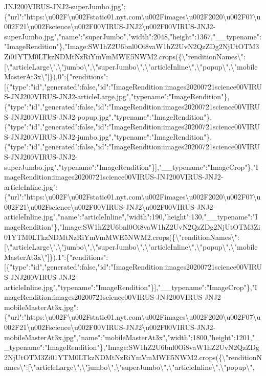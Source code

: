 JNJ200VIRUS-JNJ2-superJumbo.jpg":\{"url":"https:\textbackslash{}u002F\textbackslash{}u002Fstatic01.nyt.com\textbackslash{}u002Fimages\textbackslash{}u002F2020\textbackslash{}u002F07\textbackslash{}u002F21\textbackslash{}u002Fscience\textbackslash{}u002F00VIRUS-JNJ2\textbackslash{}u002F00VIRUS-JNJ2-superJumbo.jpg","name":"superJumbo","width":2048,"height":1367,"\_\_typename":"ImageRendition"\},"Image:SW1hZ2U6bnl0Oi8vaW1hZ2UvN2QzZDg2NjUtOTM3Zi01YTM0LTkzNDMtNzRiYmVmMWE5NWM2.crops(\{\textbackslash{}"renditionNames\textbackslash{}":{[}\textbackslash{}"articleLarge\textbackslash{}",\textbackslash{}"jumbo\textbackslash{}",\textbackslash{}"superJumbo\textbackslash{}",\textbackslash{}"articleInline\textbackslash{}",\textbackslash{}"popup\textbackslash{}",\textbackslash{}"mobileMasterAt3x\textbackslash{}"{]}\}).0":\{"renditions":{[}\{"type":"id","generated":false,"id":"ImageRendition:images20200721science00VIRUS-JNJ200VIRUS-JNJ2-articleLarge.jpg","typename":"ImageRendition"\},\{"type":"id","generated":false,"id":"ImageRendition:images20200721science00VIRUS-JNJ200VIRUS-JNJ2-popup.jpg","typename":"ImageRendition"\},\{"type":"id","generated":false,"id":"ImageRendition:images20200721science00VIRUS-JNJ200VIRUS-JNJ2-jumbo.jpg","typename":"ImageRendition"\},\{"type":"id","generated":false,"id":"ImageRendition:images20200721science00VIRUS-JNJ200VIRUS-JNJ2-superJumbo.jpg","typename":"ImageRendition"\}{]},"\_\_typename":"ImageCrop"\},"ImageRendition:images20200721science00VIRUS-JNJ200VIRUS-JNJ2-articleInline.jpg":\{"url":"https:\textbackslash{}u002F\textbackslash{}u002Fstatic01.nyt.com\textbackslash{}u002Fimages\textbackslash{}u002F2020\textbackslash{}u002F07\textbackslash{}u002F21\textbackslash{}u002Fscience\textbackslash{}u002F00VIRUS-JNJ2\textbackslash{}u002F00VIRUS-JNJ2-articleInline.jpg","name":"articleInline","width":190,"height":130,"\_\_typename":"ImageRendition"\},"Image:SW1hZ2U6bnl0Oi8vaW1hZ2UvN2QzZDg2NjUtOTM3Zi01YTM0LTkzNDMtNzRiYmVmMWE5NWM2.crops(\{\textbackslash{}"renditionNames\textbackslash{}":{[}\textbackslash{}"articleLarge\textbackslash{}",\textbackslash{}"jumbo\textbackslash{}",\textbackslash{}"superJumbo\textbackslash{}",\textbackslash{}"articleInline\textbackslash{}",\textbackslash{}"popup\textbackslash{}",\textbackslash{}"mobileMasterAt3x\textbackslash{}"{]}\}).1":\{"renditions":{[}\{"type":"id","generated":false,"id":"ImageRendition:images20200721science00VIRUS-JNJ200VIRUS-JNJ2-articleInline.jpg","typename":"ImageRendition"\}{]},"\_\_typename":"ImageCrop"\},"ImageRendition:images20200721science00VIRUS-JNJ200VIRUS-JNJ2-mobileMasterAt3x.jpg":\{"url":"https:\textbackslash{}u002F\textbackslash{}u002Fstatic01.nyt.com\textbackslash{}u002Fimages\textbackslash{}u002F2020\textbackslash{}u002F07\textbackslash{}u002F21\textbackslash{}u002Fscience\textbackslash{}u002F00VIRUS-JNJ2\textbackslash{}u002F00VIRUS-JNJ2-mobileMasterAt3x.jpg","name":"mobileMasterAt3x","width":1800,"height":1201,"\_\_typename":"ImageRendition"\},"Image:SW1hZ2U6bnl0Oi8vaW1hZ2UvN2QzZDg2NjUtOTM3Zi01YTM0LTkzNDMtNzRiYmVmMWE5NWM2.crops(\{\textbackslash{}"renditionNames\textbackslash{}":{[}\textbackslash{}"articleLarge\textbackslash{}",\textbackslash{}"jumbo\textbackslash{}",\textbackslash{}"superJumbo\textbackslash{}",\textbackslash{}"articleInline\textbackslash{}",\textbackslash{}"popup\textbackslash{}",\textbackslas